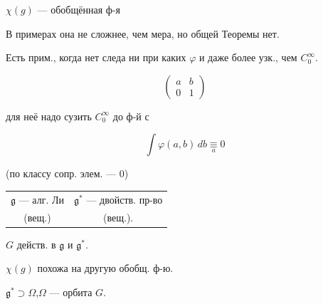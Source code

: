 $\chi(g)$ --- обобщённая ф-я





В примерах она не сложнее, чем мера, но общей
Теоремы нет.





Есть прим., когда нет следа ни при каких $\varphi$ и
даже более узк., чем $C_0^{\infty}$.





\begin{equation*}
\begin{pmatrix}a&b\\0&1\end{pmatrix}
\end{equation*}

для неё надо сузить $C_0^{\infty}$ до ф-й с





\begin{equation*}
\int\varphi(a,b)\,db\underset{a}{\equiv}0
\end{equation*}

(по классу сопр. элем. --- $0$)







\begin{center}\begin{tabular}{cc}
$\mathfrak g$ --- алг. Ли&$\mathfrak g^*$ --- двойств. пр-во\\
(вещ.)&(вещ.).
\end{tabular}\end{center}





$G$ действ. в $\mathfrak g$ и $\mathfrak g^*$.

$\chi(g)$ похожа на другую обобщ. ф-ю.

$\mathfrak g^*\supset\Omega$,\qquad $\Omega$ --- орбита $G$.

